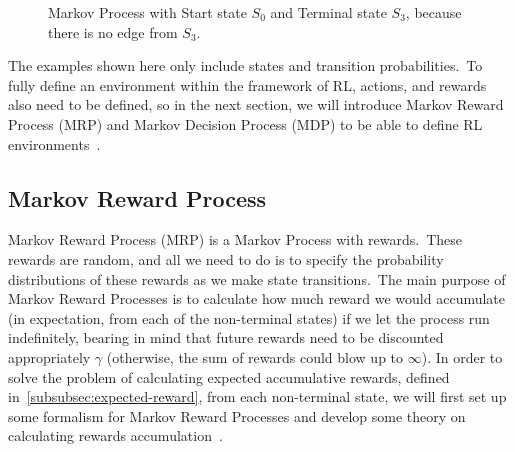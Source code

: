 \documentclass[../xlapes02]{subfiles}
\begin{document}
    \begin{figure}[H]
        \begin{center}
            \caption{Markov Process with Start state $S_0$ and Terminal state $S_3$, because there is no edge from $S_3$.}
            \label{fig:markov-process}
        \end{center}
        \centering
    \end{figure}

    The examples shown here only include states and transition probabilities.\ To fully define an environment within the framework of RL, actions, and rewards also need to be defined, so in the next section, we will introduce Markov Reward Process (MRP) and Markov Decision Process (MDP) to be able to define RL environments~\cite{sutton2018reinforcement}.

    \subsection{Markov Reward Process}\label{subsec:markov-reward-process}
    Markov Reward Process (MRP) is a Markov Process with rewards.\ These rewards are random, and all we need to do is to specify the probability distributions of these rewards as we make state transitions.\ The main purpose of Markov Reward Processes is to calculate how much reward we would accumulate (in expectation, from each of the non-terminal states) if we let the process run indefinitely, bearing in mind that future rewards need to be discounted appropriately $\gamma$ (otherwise, the sum of rewards could blow up to $\infty$). In order to solve the problem of calculating expected accumulative rewards, defined in~\cref{subsubsec:expected-reward}, from each non-terminal state, we will first set up some formalism for Markov Reward Processes and develop some theory on calculating rewards accumulation~\cite{rao2022foundations}.
\end{document}
